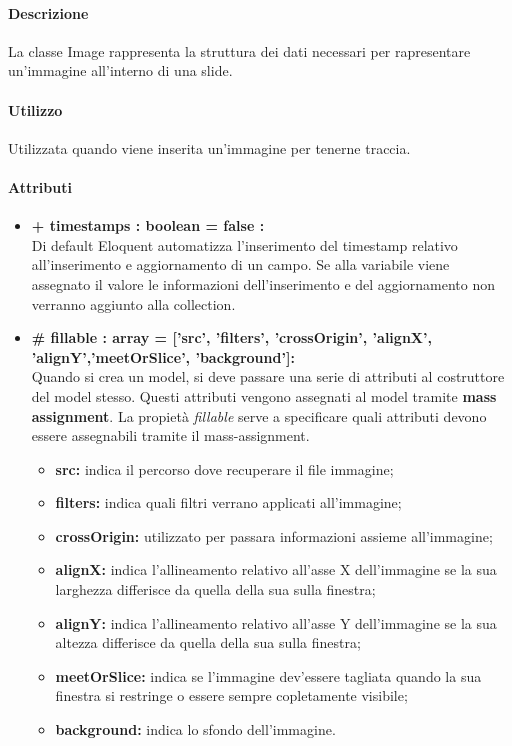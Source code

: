 
	\paragraph{Descrizione}
	La classe Image rappresenta la struttura dei dati necessari per rapresentare un’immagine all’interno di una slide.
	
	\paragraph{Utilizzo}
	Utilizzata quando viene inserita un’immagine per tenerne traccia.
	
	\paragraph{Attributi}
	\begin{itemize}
		\item \textbf{+ timestamps : boolean = false :}\\
		Di default Eloquent automatizza l'inserimento del timestamp relativo all'inserimento e aggiornamento di un campo. Se alla variabile viene assegnato il valore le informazioni dell'inserimento e del aggiornamento non verranno aggiunto alla collection.
		\item \textbf{\# fillable : array = [’src’, ’filters’, ’crossOrigin’, ’alignX’, ’alignY’,’meetOrSlice’, ’background’]:}\\
		Quando si crea un model, si deve passare una serie di attributi al costruttore del model stesso. Questi attributi vengono assegnati al model tramite \textbf{mass assignment}. La propietà \textit{fillable} serve a specificare quali attributi devono essere assegnabili tramite il mass-assignment.
		\begin{itemize}
			\item \textbf{src:} indica il percorso dove recuperare il file immagine;
			\item \textbf{filters:} indica quali filtri verrano applicati all'immagine;
			\item \textbf{crossOrigin:} utilizzato per passara informazioni assieme all'immagine;
			\item \textbf{alignX:} indica l'allineamento relativo all'asse X dell'immagine se la sua larghezza differisce da quella della sua sulla finestra;
			\item \textbf{alignY:} indica l'allineamento relativo all'asse Y dell'immagine se la sua altezza differisce da quella della sua sulla finestra;
			\item \textbf{meetOrSlice:} indica se l'immagine dev'essere tagliata quando la sua finestra si restringe o essere sempre copletamente visibile;
			\item \textbf{background:} indica lo sfondo dell'immagine.
		\end{itemize}
	\end{itemize}
\newpage



